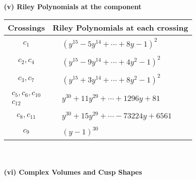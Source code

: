 \documentclass[1p]{elsarticle_modified}
\theoremstyle{definition}
\begin{document}
\newpage\renewcommand{\arraystretch}{1}
\flushleft \textbf{(v) Riley Polynomials at the component}\newline \\
\begin{tabular}{m{50pt}|m{274pt}}
Crossings & \hspace{64pt}Riley Polynomials at each crossing \\
\hline $$\begin{aligned}c_{1}\end{aligned}$$&$\begin{aligned}
&(y^{15}-5 y^{14}+\cdots+8 y-1)^{2}
\end{aligned}$\\
\hline $$\begin{aligned}c_{2},c_{4}\end{aligned}$$&$\begin{aligned}
&(y^{15}-9 y^{14}+\cdots+4 y^2-1)^{2}
\end{aligned}$\\
\hline $$\begin{aligned}c_{3},c_{7}\end{aligned}$$&$\begin{aligned}
&(y^{15}+3 y^{14}+\cdots+8 y^2-1)^{2}
\end{aligned}$\\
\hline $$\begin{aligned}c_{5},c_{6},c_{10}\\c_{12}\end{aligned}$$&$\begin{aligned}
&y^{30}+11 y^{29}+\cdots+1296 y+81
\end{aligned}$\\
\hline $$\begin{aligned}c_{8},c_{11}\end{aligned}$$&$\begin{aligned}
&y^{30}+15 y^{29}+\cdots-73224 y+6561
\end{aligned}$\\
\hline $$\begin{aligned}c_{9}\end{aligned}$$&$\begin{aligned}
&(y-1)^{30}
\end{aligned}$\\
\hline
\end{tabular}\\~\\
\newpage\flushleft \textbf{(vi) Complex Volumes and Cusp Shapes}
\end{document}
